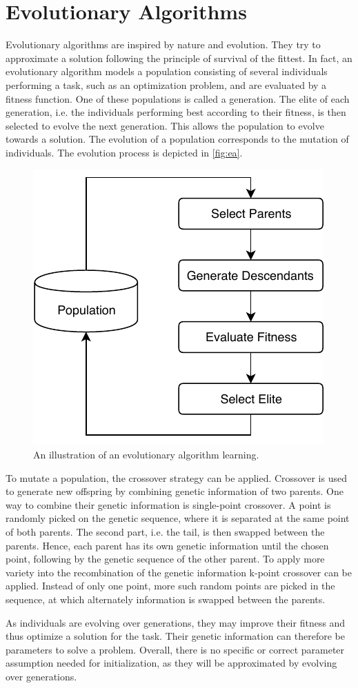 \section{Evolutionary Algorithms}
\label{sec:ea}
Evolutionary algorithms are inspired by nature and evolution.
They try to approximate a solution following the principle of survival of the fittest.
In fact, an evolutionary algorithm models a population consisting of several individuals performing a task, such as an optimization problem, and are evaluated by a fitness function.
One of these populations is called a generation.
The elite of each generation, i.e. the individuals performing best according to their fitness, is then selected to evolve the next generation.
This allows the population to evolve towards a solution.
The evolution of a population corresponds to the mutation of individuals.
The evolution process is depicted in \autoref{fig:ea}.

\begin{figure}[h]
\centering
\includegraphics[width=.7\columnwidth]{figures/ea_fig.pdf}
\caption{An illustration of an evolutionary algorithm learning. \cite{Dillmann2017}}
\label{fig:ea}
\end{figure}

To mutate a population, the crossover strategy can be applied.
Crossover is used to generate new offspring by combining genetic information of two parents.
One way to combine their genetic information is single-point crossover.
A point is randomly picked on the genetic sequence, where it is separated at the same point of both parents.
The second part, i.e. the tail, is then swapped between the parents.
Hence, each parent has its own genetic information until the chosen point, following by the genetic sequence of the other parent.
To apply more variety into the recombination of the genetic information k-point crossover can be applied.
Instead of only one point, more such random points are picked in the sequence, at which alternately information is swapped between the parents.

As individuals are evolving over generations, they may improve their fitness and thus optimize a solution for the task.
Their genetic information can therefore be parameters to solve a problem.
Overall, there is no specific or correct parameter assumption needed for initialization, as they will be approximated by evolving over generations.
